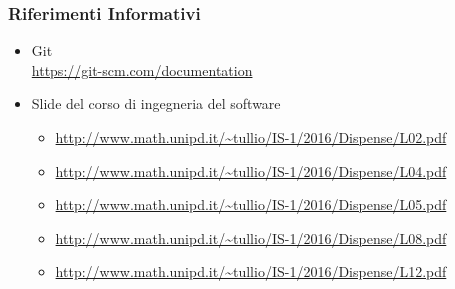 	    \subsubsection{Riferimenti Informativi}
        \begin{itemize}
        \item Git \\
        \url{https://git-scm.com/documentation}
         \item Slide del corso di ingegneria del software
          \begin{itemize}
           \item \url{http://www.math.unipd.it/~tullio/IS-1/2016/Dispense/L02.pdf}
           \item \url{http://www.math.unipd.it/~tullio/IS-1/2016/Dispense/L04.pdf}
           \item \url{http://www.math.unipd.it/~tullio/IS-1/2016/Dispense/L05.pdf}
           \item \url{http://www.math.unipd.it/~tullio/IS-1/2016/Dispense/L08.pdf}
           \item \url{http://www.math.unipd.it/~tullio/IS-1/2016/Dispense/L12.pdf}
          \end{itemize}
        \end{itemize}